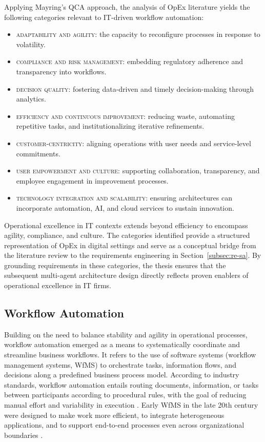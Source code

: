 Applying Mayring's QCA approach, the analysis of OpEx literature yields the following categories relevant to IT-driven workflow automation:
\begin{itemize}
    \item \textsc{adaptability and agility:} the capacity to reconfigure processes in response to volatility.
    \item \textsc{compliance and risk management:} embedding regulatory adherence and transparency into workflows.
    \item \textsc{decision quality:} fostering data-driven and timely decision-making through analytics.
    \item \textsc{efficiency and continuous improvement:} reducing waste, automating repetitive tasks, and institutionalizing iterative refinements.
    \item \textsc{customer-centricity:} aligning operations with user needs and service-level commitments.
    \item \textsc{user empowerment and culture:} supporting collaboration, transparency, and employee engagement in improvement processes.
    \item \textsc{technology integration and scalability:} ensuring architectures can incorporate automation, AI, and cloud services to sustain innovation.
\end{itemize}

Operational excellence in IT contexts extends beyond efficiency to encompass agility, compliance, and culture. The categories identified provide a structured representation of OpEx in digital settings and serve as a conceptual bridge from the literature review to the requirements engineering in Section~\ref{subsec:re-sa}. By grounding requirements in these categories, the thesis ensures that the subsequent multi-agent architecture design directly reflects proven enablers of operational excellence in IT firms.

\subsection{Workflow Automation}\label{subsec:workflow-auto}
Building on the need to balance stability and agility in operational processes, workflow automation emerged as a means to systematically coordinate and streamline business workflows. It refers to the use of software systems (workflow management systems, WfMS) to orchestrate tasks, information flows, and decisions along a predefined business process model. According to industry standards, workflow automation entails routing documents, information, or tasks between participants according to procedural rules, with the goal of reducing manual effort and variability in execution \parencite{basuResearch2002}. Early WfMS in the late 20th century were designed to make work more efficient, to integrate heterogeneous applications, and to support end-to-end processes even across organizational boundaries \parencite{stohrWorkflow2001}.

